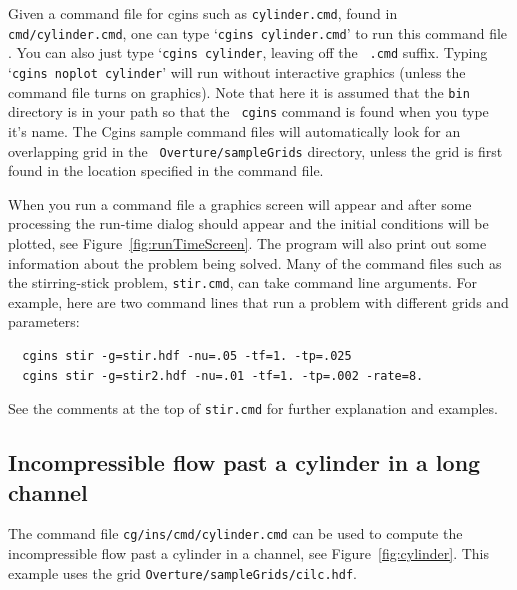 \documentclass{article}
\newcommand{\Index}[1]{#1\index{#1}}
\begin{document}
Given a \Index{command file} for cgins such as {\tt cylinder.cmd}, found in {\tt
cmd/cylinder.cmd}, one can type `{\tt cgins cylinder.cmd}' to run this command
file . You can also just type `{\tt cgins cylinder}, leaving off the {\tt
.cmd} suffix. Typing `{\tt cgins noplot cylinder}' will run without
interactive graphics (unless the command file turns on graphics). Note that here
it is assumed that the {\tt bin} directory is in your path so that the {\tt
cgins} command is found when you type it's name. The Cgins sample
command files will automatically look for an overlapping grid in the {\tt
Overture/sampleGrids} directory, unless the grid is first found in the location
specified in the command file.

When you run a command file a graphics screen will appear and after some
processing the run-time dialog should appear and the initial conditions will be
plotted, see Figure~\ref{fig:runTimeScreen}. The program will also print out some information about the problem
being solved. 
Many of the command files such as the stirring-stick problem, {\tt stir.cmd},
can take command line arguments.  For example, here
are two command lines that run a problem with different grids and parameters:
\begin{verbatim}
  cgins stir -g=stir.hdf -nu=.05 -tf=1. -tp=.025 
  cgins stir -g=stir2.hdf -nu=.01 -tf=1. -tp=.002 -rate=8.
\end{verbatim}
See the comments at the top of {\tt stir.cmd} for further explanation and examples.

\subsection{Incompressible flow past a cylinder in a long channel}

The command file {\tt cg/ins/cmd/cylinder.cmd} can be used
to compute the incompressible flow past a cylinder in a channel, see Figure~\ref{fig:cylinder}.
This example uses the grid {\tt Overture/\-sampleGrids/cilc.hdf}.
\end{document}
